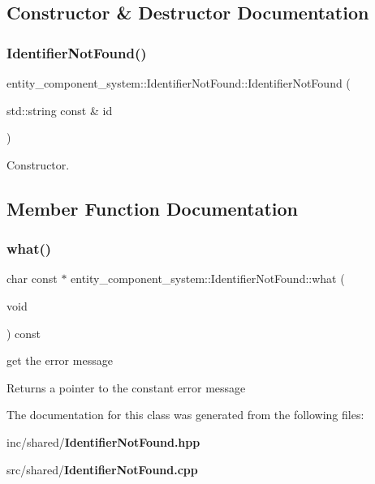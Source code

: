 \subsection{Constructor \& Destructor Documentation}
\label{classentity__component__system_1_1_identifier_not_found_a2f9ffc48c910bee477f48dcd6f577475} 
\subsubsection{Identifier\+Not\+Found()}
{\footnotesize\ttfamily entity\+\_\+component\+\_\+system\+::\+Identifier\+Not\+Found\+::\+Identifier\+Not\+Found (\begin{DoxyParamCaption}\item[{std\+::string const \&}]{id }\end{DoxyParamCaption})\hspace{0.3cm}{\ttfamily [noexcept]}}



Constructor. 



\subsection{Member Function Documentation}
\label{classentity__component__system_1_1_identifier_not_found_ae06dfcab94cfb77e21e4eaa0b893ea3a} 
\subsubsection{what()}
{\footnotesize\ttfamily char const  $\ast$ entity\+\_\+component\+\_\+system\+::\+Identifier\+Not\+Found\+::what (\begin{DoxyParamCaption}\item[{void}]{ }\end{DoxyParamCaption}) const\hspace{0.3cm}{\ttfamily [noexcept]}}



get the error message 

\begin{DoxyReturn}{Returns}
a pointer to the constant error message 
\end{DoxyReturn}


The documentation for this class was generated from the following files\+:\begin{DoxyCompactItemize}
\item 
inc/shared/{\bf Identifier\+Not\+Found.\+hpp}\item 
src/shared/{\bf Identifier\+Not\+Found.\+cpp}\end{DoxyCompactItemize}
